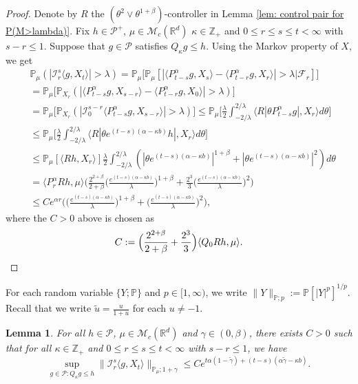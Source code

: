\documentclass[12pt,a4paper]{amsart}
\theoremstyle{plain}
\newtheorem{lem}[thm]{Lemma}
\theoremstyle{definition}
\numberwithin{equation}{section}
\begin{document}
\begin{proof}
  Denote by $R$ the $(\theta^2\vee\theta^{1+\beta})$-controller in Lemma \ref{lem: control pair for P(M>lambda)}.
  Fix $h \in \mathcal P^+$, $\mu \in \mathcal M_c(\mathbb R^d)$ $\kappa \in \mathbb Z_+ $ and $0\leq r\leq s\leq t < \infty$ with $s-r \leq 1$.
  Suppose that $g\in \mathcal P$ satisfies $Q_\kappa g \leq h$.
  Using the Markov property of $X$, we get
\begin{align}
  & \mathbb P_{\mu}(|\mathcal I_r^s\langle g, X_t\rangle|>\lambda)
    = \mathbb P_\mu \Big[\mathbb P_\mu [|\langle P_{t-s}^\alpha g, X_{s}\rangle - \langle P_{t-r}^\alpha g, X_{r}\rangle|> \lambda | \mathscr F_r ]\Big] \\
  & = \mathbb P_\mu \big[\mathbb P_{X_r}(|\langle P_{t-s}^\alpha g, X_{s-r}\rangle - \langle P_{t-r}^\alpha g, X_{0}\rangle|> \lambda)\big] \\
  & = \mathbb P_\mu \big[\mathbb P_{X_r}(|\mathcal I_0^{s-r}\langle P_{t-s}^\alpha g, X_{s-r}\rangle |> \lambda)\big]
  \leq \mathbb P_\mu \Big[ \frac{\lambda}{2}\int_{-2/\lambda}^{2/\lambda}\langle R|\theta P^\alpha_{t-s}g|,X_r\rangle d\theta \Big] \\
  & \leq \mathbb P_\mu \Big[ \frac{\lambda}{2}\int_{-2/\lambda}^{2/\lambda}\langle R|\theta e^{(t-s)(\alpha- \kappa b)}h|,X_r\rangle d\theta \Big] \\
  & \leq \mathbb P_\mu [ \langle Rh,X_r\rangle ] \frac{\lambda}{2}\int_{-2/\lambda}^{2/\lambda}(|\theta e^{(t-s)(\alpha- \kappa b)}|^{1+\beta} + |\theta e^{(t-s)(\alpha- \kappa b)}|^{2})d\theta
  \\ & =  \langle P_r^\alpha Rh,\mu\rangle \Big(  \frac{2^{2+\beta}}{2+\beta}\Big(\frac{e^{(t-s)(\alpha- \kappa b)}}{\lambda}\Big)^{1+\beta} + \frac{2^{3}}{3}\Big(\frac{e^{(t-s)(\alpha- \kappa b)}}{\lambda}\Big)^2\Big)
  \\ & \leq C e^{\alpha r} \Big(\Big( \frac{e^{(t-s)(\alpha - \kappa b)}}{\lambda}\Big)^{1+\beta} + \Big( \frac{e^{(t-s)(\alpha - \kappa b)}}{\lambda}\Big)^{2} \Big),
\end{align}
where the $C>0$ above is chosen as
\[
  C := \Big(\frac{2^{2+\beta}}{2+\beta} + \frac{2^{3}}{3} \Big)\langle Q_0Rh, \mu\rangle.
  \qedhere
\]
\end{proof}


For each random variable $\{Y; \mathbb P\}$ and $p \in [1,\infty)$, we write $ \|Y\|_{\mathbb P;p} := \mathbb P[|Y|^p]^{1/p}$.
Recall that we write $\tilde u = \frac{u}{1+u}$ for each $u\neq -1$.
\begin{lem}
  \label{lem: control of mgtrs}
  For all $h \in \mathcal P$, $\mu \in \mathcal M_c(\mathbb R^d)$ and $\gamma\in (0, \beta)$, there exists $C > 0$ such that for all $\kappa \in \mathbb Z_+$ and $0\leq r \leq s\leq t<\infty$ with $s-r \leq 1$, we have
  \[
    \sup_{g \in \mathcal P: Q_\kappa g \leq h} \|\mathcal I_r^s\langle g, X_t\rangle \|_{\mathbb P_\mu;1+\gamma}
    \leq C e^{t\alpha (1- \tilde \gamma)+(t-s) (\alpha \tilde \gamma - \kappa b)}.
  \]
\end{lem}
\end{document}
